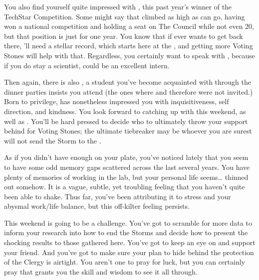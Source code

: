 \documentclass[char]{GL2020}
\begin{document}
You also find yourself quite impressed with \cTechStar{\full}, this past year's winner of the TechStar Competition. Some might say that \cTechStar{\theyhave} climbed as high as \cTechStar{\they} can go, having won a national competition and holding a seat on The Council while not even 20, but that position is just for one year. You know that if \cTechStar{\they} ever wants to get back there, \cTechStar{\they}'ll need a stellar record, which starts here at the \pSc{}, and getting more Voting Stones will help with that. Regardless, you certainly want to speak with \cTechStar{}, because if you do stay a scientist, \cTechStar{\they} could be an excellent intern.  

Then again, there is also \cHeir{\full}, a student you've become acquainted with through the dinner parties \cHeir{\their} \cDiplomat{\auncle} \cDiplomat{} insists you attend (the ones where \cAntiChup{} and therefore \cScholarship{} were not invited.) Born to privilege, \cHeir{} has nonetheless impressed you with \cHeir{\their} inquisitiveness, self direction, and kindness. You look forward to catching up with \cHeir{\them} this weekend, as well as \cScholarship{}. You'll be hard pressed to decide who to ultimately throw your support behind for Voting Stones; the ultimate tiebreaker may be whoever you are surest will not send the Storm to the \pTech{}.

As if you didn't have enough on your plate, you've noticed lately that you seem to have some odd memory gaps scattered across the last several years. You have plenty of memories of working in the lab, but your personal life seems\ldots{} thinned out somehow. It is a vague, subtle, yet troubling feeling that you haven't quite been able to shake. Thus far, you've been attributing it to stress and your abysmal work/life balance, but this off-kilter feeling persists.

This weekend is going to be a challenge. You've got to scramble for more data to inform your research into how to end the Storms and decide how to present the shocking results to those gathered here. You've got to keep an eye on \cChupInventor{} and support your friend. And you've got to make sure your plan to hide behind the protection of the Clergy is airtight. You aren't one to pray for luck, but you can certainly pray that \cTechGod{} grants you the skill and wisdom to see it all through.
\end{document}
